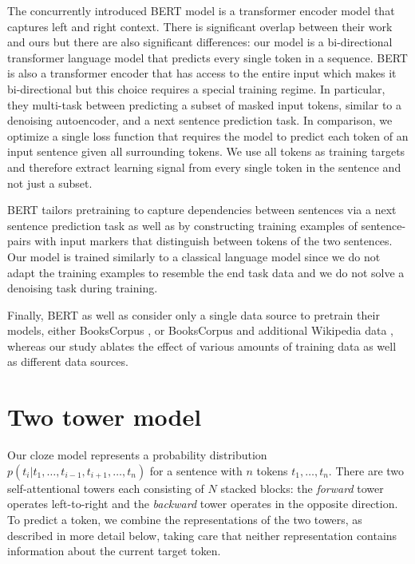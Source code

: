 \documentclass[11pt,a4paper]{article}
\begin{document}
The concurrently introduced BERT model \citep{devlin2018bert} is a transformer encoder model that captures left and right context.
There is significant overlap between their work and ours but there are also significant differences: our model is a bi-directional transformer language model that predicts every single token in a sequence.
BERT is also a transformer encoder that has access to the entire input which makes it bi-directional but this choice requires a special training regime. 
In particular, they multi-task between predicting a subset of masked input tokens, similar to a denoising autoencoder, and a next sentence prediction task.
In comparison, we optimize a single loss function that requires the model to predict each token of an input sentence given all surrounding tokens.
We use all tokens as training targets and therefore extract learning signal from every single token in the sentence and not just a subset.

BERT tailors pretraining to capture dependencies between sentences via a next sentence prediction task as well as by constructing training examples of sentence-pairs with input markers that distinguish between tokens of the two sentences. 
Our model is trained similarly to a classical language model since we do not adapt the training examples to resemble the end task data and we do not solve a denoising task during training.

Finally, BERT as well as \citet{radford2018unsup} consider only a single data source to pretrain their models, either BooksCorpus \citep{radford2018unsup}, or BooksCorpus and additional Wikipedia data \citep{devlin2018bert}, whereas our study ablates the effect of various amounts of training data as well as different data sources.




\section{Two tower model}

Our cloze model represents a probability distribution  $p(t_i|t_1, \dots, t_{i-1}, t_{i+1}, \dots, t_n)$ for a sentence with $n$ tokens $t_1, \dots, t_n$.
There are two self-attentional towers each consisting of $N$ stacked blocks:
the \emph{forward} tower operates left-to-right and the \emph{backward} tower operates in the opposite direction.
To predict a token, we combine the representations of the two towers, as described in more detail below, taking care that neither representation contains information about the current target token.
\end{document}

